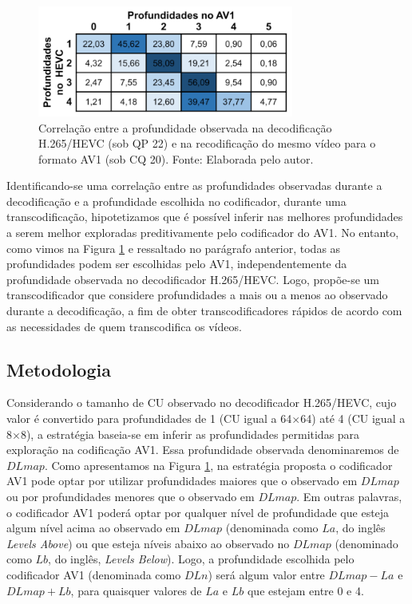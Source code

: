 \begin{figure}
    \centering
    \includegraphics[width=0.75\textwidth]{FIGURES/fig_19.png}
    \caption{Correlação entre a profundidade observada na decodificação H.265/HEVC (sob QP 22) e na recodificação do mesmo vídeo para o formato AV1 (sob CQ 20). Fonte: Elaborada pelo autor.}
    \label{fig:19}
\end{figure}

Identificando-se uma correlação entre as profundidades observadas durante a decodificação e a profundidade escolhida no codificador, durante uma transcodificação, hipotetizamos que é possível inferir nas melhores profundidades a serem melhor exploradas preditivamente pelo codificador do AV1. No entanto, como vimos na Figura \ref{fig:19} e ressaltado no parágrafo anterior, todas as profundidades podem ser escolhidas pelo AV1, independentemente da profundidade observada no decodificador H.265/HEVC. Logo, propõe-se um transcodificador que considere profundidades a mais ou a menos ao observado durante a decodificação, a fim de obter transcodificadores rápidos de acordo com as necessidades de quem transcodifica os vídeos.

\subsection{Metodologia}
\label{cap:6.1.1}

Considerando o tamanho de CU observado no decodificador H.265/HEVC, cujo valor é convertido para profundidades de 1 (CU igual a 64$\times$64) até 4 (CU igual a 8$\times$8), a estratégia baseia-se em inferir as profundidades permitidas para exploração na codificação AV1. Essa profundidade observada denominaremos de $DLmap$. Como apresentamos na Figura \ref{fig:19}, na estratégia proposta o codificador AV1 pode optar por utilizar profundidades maiores que o observado em $DLmap$ ou por profundidades menores que o observado em $DLmap$. Em outras palavras, o codificador AV1 poderá optar por qualquer nível de profundidade que esteja algum nível acima ao observado em $DLmap$ (denominada como $La$, do inglês \textit{Levels Above}) ou que esteja níveis abaixo ao observado no $DLmap$ (denominado como $Lb$, do inglês, \textit{Levels Below}). Logo, a profundidade escolhida pelo codificador AV1 (denominada como $DLn$) será algum valor entre $DLmap - La$ e $DLmap + Lb$, para quaisquer valores de $La$ e $Lb$ que estejam entre 0 e 4.

